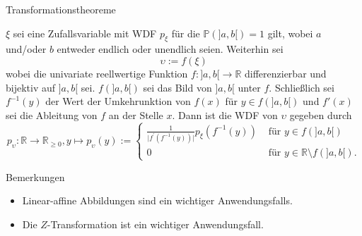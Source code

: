 \documentclass[
  8pt,
  ignorenonframetext,
]{beamer}
\providecommand{\tightlist}{%
  \setlength{\itemsep}{0pt}\setlength{\parskip}{0pt}}
\newcommand{\ups}{\upsilon}
\begin{document}
\begin{frame}{Transformationstheoreme}
\protect\hypertarget{transformationstheoreme-1}{}
\small
\begin{theorem}
\normalfont
\justifying
$\xi$ sei eine Zufallsvariable mit WDF $p_\xi$ für die $\mathbb{P}(]a,b[) = 1$ gilt,
wobei $a$ und/oder $b$ entweder endlich oder unendlich seien. Weiterhin sei
\begin{equation}
\ups := f(\xi)
\end{equation}
wobei die univariate reellwertige Funktion $f : ]a,b[ \to \mathbb{R}$ differenzierbar
und bijektiv auf $]a,b[$ sei. $f(]a,b[)$ sei das Bild von $]a,b[$ unter $f$.
Schließlich sei $f^{-1}(y)$ der Wert der Umkehrunktion von $f(x)$ für
$y \in f(]a,b[)$ und $f'(x)$ sei die Ableitung von $f$ an der Stelle $x$.
Dann ist die WDF von $\ups$ gegeben durch
\begin{equation}
p_\ups : \mathbb{R} \to \mathbb{R}_{\ge 0}, y \mapsto p_\ups(y) :=
\begin{cases}
\frac{1}{\vert  f^{'}\left(f^{-1}(y)\right) \vert}p_\xi\left(f^{-1}(y)\right)
& \mbox{ für } y \in f(]a,b[) \\
0
& \mbox{ für } y \in \mathbb{R} \setminus f(]a,b[).
\end{cases}
\end{equation}
\end{theorem}

\footnotesize

Bemerkungen

\begin{itemize}
\tightlist
\item
  Linear-affine Abbildungen sind ein wichtiger Anwendungsfalls.
\item
  Die \(Z\)-Transformation ist ein wichtiger Anwendungsfall.
\end{itemize}
\end{frame}
\end{document}

